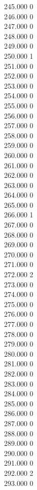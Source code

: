 { 245.000	0 \\
 246.000	0 \\
 247.000	0 \\
 248.000	0 \\
 249.000	0 \\
 250.000	1 \\
 251.000	0 \\
 252.000	0 \\
 253.000	0 \\
 254.000	0 \\
 255.000	0 \\
 256.000	0 \\
 257.000	0 \\
 258.000	0 \\
 259.000	0 \\
 260.000	0 \\
 261.000	0 \\
 262.000	0 \\
 263.000	0 \\
 264.000	0 \\
 265.000	0 \\
 266.000	1 \\
 267.000	0 \\
 268.000	0 \\
 269.000	0 \\
 270.000	0 \\
 271.000	0 \\
 272.000	2 \\
 273.000	0 \\
 274.000	0 \\
 275.000	0 \\
 276.000	0 \\
 277.000	0 \\
 278.000	0 \\
 279.000	0 \\
 280.000	0 \\
 281.000	0 \\
 282.000	0 \\
 283.000	0 \\
 284.000	0 \\
 285.000	0 \\
 286.000	0 \\
 287.000	0 \\
 288.000	0 \\
 289.000	0 \\
 290.000	0 \\
 291.000	0 \\
 292.000	2 \\
 293.000	0 \\
}
